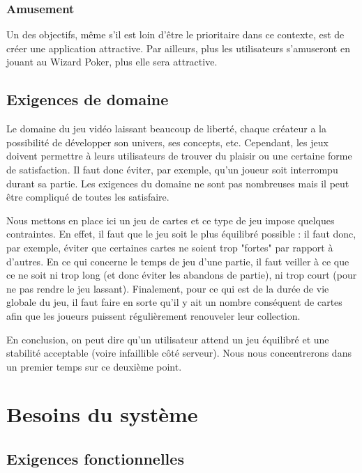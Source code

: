 \documentclass[11pt,a4paper]{article}
\begin{document}
\subsubsection*{Amusement}
Un des objectifs, même s'il est loin d'être le prioritaire dans ce contexte, est de créer une application attractive. Par ailleurs, plus les utilisateurs s'amuseront en jouant au Wizard Poker, plus elle sera attractive.


\subsection{Exigences de domaine}
\label{sec:exi-dom}

Le domaine du jeu vidéo laissant beaucoup de liberté, chaque créateur a la possibilité de développer son univers, ses concepts, etc.  Cependant, les jeux doivent permettre à leurs utilisateurs de trouver du plaisir ou une certaine forme de satisfaction.  Il faut donc éviter, par exemple, qu'un joueur soit interrompu durant sa partie.  Les exigences du domaine ne sont pas nombreuses mais il peut être compliqué de toutes les satisfaire.

\medbreak

Nous mettons en place ici un jeu de cartes et ce type de jeu impose quelques contraintes.  En effet, il faut que le jeu soit le plus équilibré possible : il faut donc, par exemple, éviter que certaines cartes ne soient trop "fortes" par rapport à d'autres.  En ce qui concerne le temps de jeu d'une partie, il faut veiller à ce que ce ne soit ni trop long (et donc éviter les abandons de partie), ni trop court (pour ne pas rendre le jeu lassant). Finalement, pour ce qui est de la durée de vie globale du jeu, il faut faire en sorte qu'il y ait un nombre conséquent de cartes afin que les joueurs puissent régulièrement renouveler leur collection.

\medbreak

En conclusion, on peut dire qu'un utilisateur attend un jeu équilibré et une stabilité acceptable (voire infaillible côté serveur).  Nous nous concentrerons dans un premier temps sur ce deuxième point.



\section{Besoins du système}
\label{sec:besoins-sys}

\subsection{Exigences fonctionnelles}
\label{sec:exi-fonc-sys}
\end{document}

